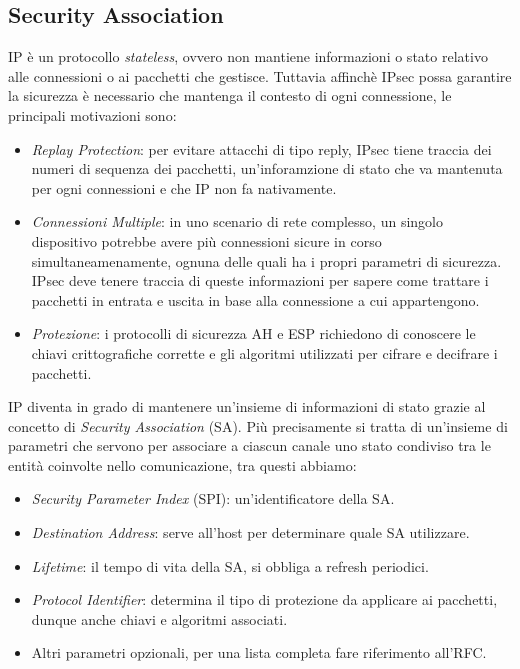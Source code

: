 \subsection{Security Association}

IP è un protocollo \textit{stateless}, ovvero non mantiene informazioni o stato relativo alle connessioni o ai pacchetti che gestisce.
Tuttavia affinchè IPsec possa garantire la sicurezza è necessario che mantenga il contesto di ogni connessione, le principali motivazioni sono:
\begin{itemize}
    \item \textit{Replay Protection}: per evitare attacchi di tipo reply, IPsec tiene  traccia
    dei numeri di sequenza dei pacchetti, un'inforamzione di stato che va mantenuta per ogni connessioni
    e che IP non fa nativamente.
    \item \textit{Connessioni Multiple}: in uno scenario di rete complesso, un singolo dispositivo potrebbe avere più connessioni sicure in corso simultaneamenamente, ognuna
    delle quali ha i propri parametri di sicurezza. IPsec deve tenere traccia di queste informazioni per sapere come trattare i pacchetti in entrata e uscita in base alla connessione a cui appartengono.
    \item \textit{Protezione}: i protocolli di sicurezza AH e ESP richiedono di conoscere le chiavi crittografiche corrette e gli algoritmi utilizzati per cifrare e decifrare i pacchetti.
\end{itemize}

\noindent 
IP diventa in grado di mantenere un'insieme di informazioni di stato grazie al concetto di \textit{Security Association} (SA).
Più precisamente si tratta di un'insieme di parametri che servono per associare a ciascun canale uno stato condiviso tra le entità coinvolte nello comunicazione,
tra questi abbiamo:

\begin{itemize}
    \item \textit{Security Parameter Index} (SPI): un'identificatore della SA.
    \item \textit{Destination Address}: serve all'host per determinare quale SA utilizzare. 
    \item \textit{Lifetime}: il tempo di vita della SA, si obbliga a refresh periodici.
    \item \textit{Protocol Identifier}: determina il tipo di protezione da applicare ai pacchetti, dunque anche chiavi e algoritmi associati.
    \item Altri parametri opzionali, per una lista completa fare riferimento all'RFC.
\end{itemize}

